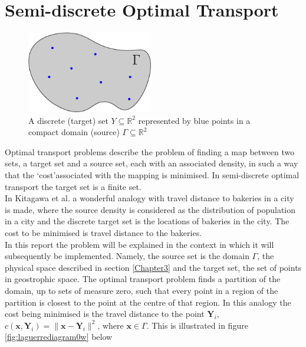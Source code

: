 \section{Semi-discrete Optimal Transport}
\begin{figure}[h]
	\centering
	\includegraphics[width=5.5cm]{project/probmeasure}
	\caption[Semi-discrete Optimal Transport]{A discrete (target) set $Y \subseteq \mathbb{R}^2$ represented by blue points in a compact domain (source) $\Gamma \subseteq \mathbb{R}^2 $}
	\label{fig:probmeasure}
\end{figure}
Optimal transport problems describe the problem of finding a map between two sets, a target set and a source set, each with an associated density, in such a way that the \textquoteleft cost\textquoteright associated with the mapping is minimised. In semi-discrete optimal transport the target set is a finite set.\\
\linebreak
In Kitagawa et al. \cite{Kitagawa2016} a wonderful analogy with travel distance to bakeries in a city is made, where the source density is considered as the distribution of population in a city and the discrete target set is the locations of bakeries in the city. The cost to be minimised is travel distance to the bakeries. 
\\
\linebreak
In this report the problem will be explained in the context in which it will subsequently be implemented. Namely, the source set is the domain $\Gamma$, the physical space described in section \ref{Chapter3} and the target set, the set of points in geostrophic space. The optimal transport problem finds a partition of the domain, up to sets of measure zero, such that every point in a region of the partition is closest to the point at the centre of that region. In this analogy the cost being minimised is the travel distance to the point $\bm{Y}_i$, $c(\bm{x},\bm{Y}_i) = \|\bm{x}-\bm{Y}_i \|^2$, where $\bm{x} \in \Gamma$. This is illustrated in figure \ref{fig:laguerrediagram0w}  below
